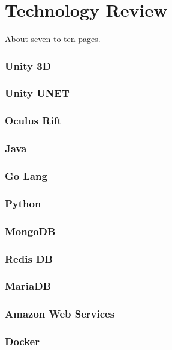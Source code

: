 
\chapter{Technology Review}
About seven to ten pages.

\subsection {Unity 3D}
\subsection {Unity UNET}
\subsection {Oculus Rift}
\subsection {Java}
\subsection {Go Lang}
\subsection {Python}
\subsection {MongoDB}
\subsection {Redis DB}
\subsection {MariaDB}
\subsection {Amazon Web Services}
\subsection {Docker}